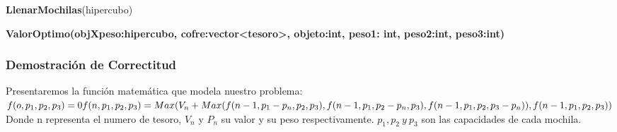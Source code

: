 \documentclass[spanish,12pt]{article}
\begin{document}
\begin{algorithm}[H]{\textbf{LlenarMochilas}(hipercubo)}
\begin{algorithmic}[1]
\begin{algorithmic}
\begin{algorithm}[H]{\textbf{ValorOptimo(objXpeso:hipercubo, cofre:vector<tesoro>, objeto:int, peso1: int, peso2:int, peso3:int)}}
\begin{algorithmic}[1]
{	\end{algorithmic}
\end{algorithm}


\subsubsection{Demostración de Correctitud}
Presentaremos la función matemática que modela nuestro problema:\\

$f(o,p_{1},p_{2},p_{3})=0 \\
f(n,p_{1},p_{2},p_{3}) = Max(V_{n}+Max(f(n-1,p_{1}-p_{n},p_{2},p_{3}), f(n-1,p_{1},p_{2}-p_{n},p_{3}), f(n-1,p_{1},p_{2},p_{3}-p_{n})),f(n-1,p_{1},p_{2},p_{3})) $
\\
Donde n representa el numero de tesoro, $V_{n}$ y $P_{n}$ su valor y su peso respectivamente. $p_{1},p_{2}\ y \ p_{3}$ son las capacidades de cada mochila. 


\end{algorithmic}
\end{algorithmic}
\end{algorithm}
\end{document}
